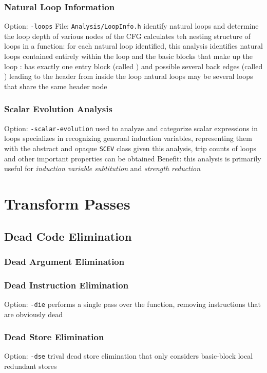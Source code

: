 \documentclass{myproc}
\begin{document}
\subsubsection{Natural Loop Information}
\bit
\w Option: \verb+-loops+
\w File: \verb+Analysis/LoopInfo.h+
\w identify natural loops and determine the loop depth of various nodes of the
CFG 
\w calculates teh nesting structure of loops in a function: for each natural
loop identified, this analysis identifies natural loops contained entirely
within the loop and the basic blocks that make up the loop
\w {}: has exactly one entry block (called ) and
possible several back edges (called ) leading to the header from
inside the loop 
\w natural loops may be several loops that share the same header node
\eit

\subsubsection{Scalar Evolution Analysis}
\bit
\w Option: \verb+-scalar-evolution+
\w used to analyze and categorize scalar expressions in loops
\w specializes in recognizing generaal induction variables, representing them
with the abstract and opaque \verb+SCEV+ class
\w given this analysis, trip counts of loops and other important properties
can be obtained
\w Benefit: this analysis is primarily useful for {\em induction variable
  subtitution\/} and {\em strength reduction\/}
\eit


\section{Transform Passes}
\subsection{Dead Code Elimination}
\subsubsection{Dead Argument Elimination}
\subsubsection{Dead Instruction Elimination}
\bit
\w Option: \verb+-die+
\w performs a single pass over the function, removing instructions that are
obviously dead 
\eit
\subsubsection{Dead Store Elimination}
\bit
\w Option: \verb+-dse+
\w trival dead store elimination that only considers basic-block local
redundant stores
\eit
\end{document}
